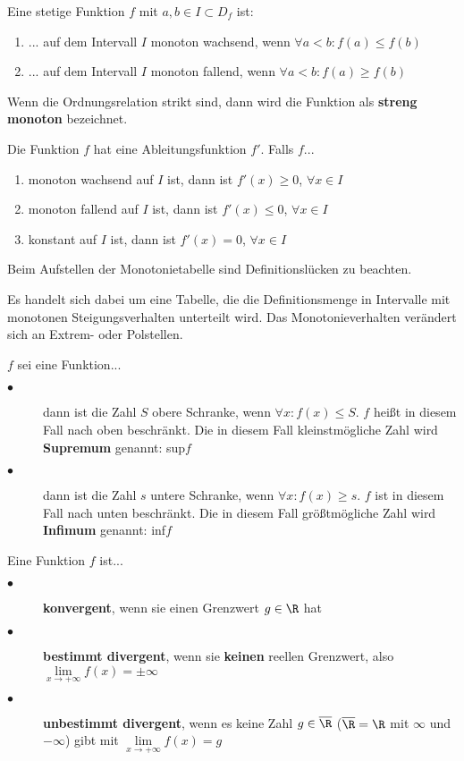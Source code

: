 \documentclass[main.tex]{subfiles}
\begin{document}
\begin{Definition}
	Eine stetige Funktion $f$ mit $a,b\in I \subset D_{f}$ ist:

	\begin{enumerate}
		\item ... auf dem Intervall $I$ monoton wachsend, wenn $\forall a < b: f(a)\leq f(b)$
		\item ... auf dem Intervall $I$ monoton fallend, wenn $\forall a < b: f(a) \geq f(b)$
	\end{enumerate}
	Wenn die Ordnungsrelation strikt sind, dann wird die Funktion als \textbf{streng monoton} bezeichnet.
	
	Die Funktion $f$ hat eine Ableitungsfunktion $f'$. Falls $f$...
	\begin{enumerate}
		\item monoton wachsend auf $I$ ist, dann ist $f'(x)\geq0$, \quad $\forall x \in I$
		\item monoton fallend auf $I$ ist, dann ist $f'(x)\leq0$, \quad $\forall x \in I$
		\item konstant auf $I$ ist, dann ist $f'(x)=0$, \quad $\forall x \in I$
	\end{enumerate}
	Beim Aufstellen der Monotonietabelle sind Definitionslücken zu beachten.
	
	Es handelt sich dabei um eine Tabelle, die die Definitionsmenge in Intervalle mit monotonen Steigungsverhalten unterteilt wird. Das Monotonieverhalten verändert sich an Extrem- oder Polstellen.
\end{Definition}

\begin{Bemerkung}
	$f$ sei eine Funktion...
	\begin{description}
		\item[$\bullet$] dann ist die Zahl $S$ obere Schranke, wenn $\forall x : f(x)\leq S$. $f$ heißt in diesem Fall nach oben beschränkt. Die in diesem Fall kleinstmögliche Zahl wird \textbf{Supremum} genannt: sup$f$
		\item[$\bullet$] dann ist die Zahl $s$ untere Schranke, wenn $\forall x : f(x) \geq s$. $f$ ist in diesem Fall nach unten beschränkt. Die in diesem Fall größtmögliche Zahl wird \textbf{Infimum} genannt: inf$f$
	\end{description}
\end{Bemerkung}

\begin{Bemerkung}
	Eine Funktion $f$ ist...
	\begin{description}
		\item[$\bullet$] \textbf{konvergent}, wenn sie einen Grenzwert $g\in\R$ hat
		\item[$\bullet$] \textbf{bestimmt divergent}, wenn sie  \textbf{keinen} reellen Grenzwert, also $\lim\limits_{x \rightarrow +\infty}{f(x)} = \pm \infty$
		\item[$\bullet$] \textbf{unbestimmt divergent}, wenn es keine Zahl $g\in\overline{\R}$ ($\overline{\R} = \R$ mit $\infty$ und $-\infty$) gibt mit $\lim\limits_{x \rightarrow +\infty}{f(x)} = g$
	\end{description}
\end{Bemerkung}
\end{document}
